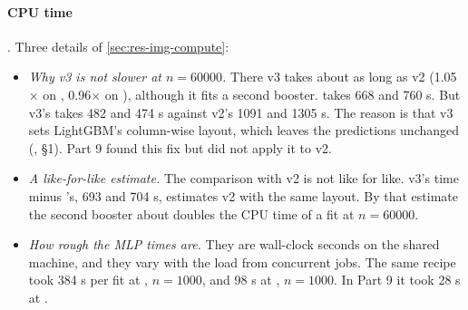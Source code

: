 \paragraph{CPU time} . Three details of \cref{sec:res-img-compute}:
\begin{itemize}
\item \emph{Why v3 is not slower at $n=60000$.} There v3 takes about as long as v2 (1.05$\times$ on , 0.96$\times$ on ), although it fits a second booster.  takes 668 and 760 s. But v3's  takes 482 and 474 s against v2's 1091 and 1305 s. The reason is that v3 sets LightGBM's column-wise layout, which leaves the predictions unchanged (, \S1). Part 9 found this fix but did not apply it to v2.
\item \emph{A like-for-like estimate.} The comparison with v2 is not like for like. v3's time minus 's, 693 and 704 s, estimates v2 with the same layout. By that estimate the second booster about doubles the CPU time of a fit at $n=60000$.
\item \emph{How rough the MLP times are.} They are wall-clock seconds on the shared machine, and they vary with the load from concurrent jobs. The same  recipe took 384 s per fit at , $n=1000$, and 98 s at , $n=1000$. In Part 9 it took 28 s at .
\end{itemize}
